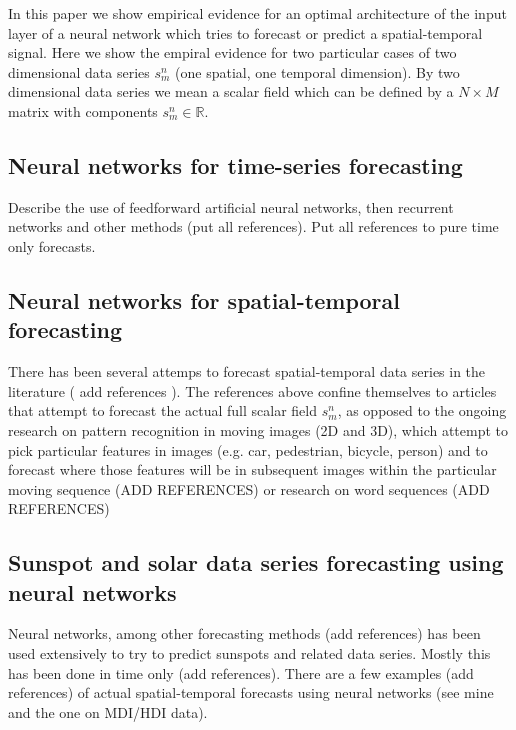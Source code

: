 \documentclass[journal]{IEEEtran}
\begin{document}
In this paper we show empirical evidence for an optimal architecture of the input layer of a neural network which tries
to forecast or predict a spatial-temporal signal. Here we show the empiral evidence for two particular cases of
two dimensional data series $s^n_m$ (one spatial,
one temporal dimension). By two dimensional data series we mean a scalar field which can be
defined by a $N\times M$ matrix with components $s^n_m \in \mathbb{R}$.

\subsection{Neural networks for time-series forecasting}

\cite{McCulloch1943}

Describe the use of feedforward artificial neural networks, then recurrent networks and other methods (put all references).
Put all references to pure time only forecasts.

\subsection{Neural networks for spatial-temporal forecasting}

There has been several attemps to forecast spatial-temporal data series in the literature ( add references \cite{2017arXiv170805094M,
2017arXiv171100636M, ghaderi2017deepforecast}).
The references above
confine themselves to articles that attempt to forecast the actual full scalar field  $s^n_m$, as opposed to the ongoing research on
pattern recognition in moving images (2D and 3D), which attempt to pick particular features in images (e.g. car, pedestrian, bicycle,
person) and to forecast where those features will be in subsequent images within the particular moving sequence (ADD REFERENCES)
 or research
on word sequences (ADD REFERENCES)

\subsection{Sunspot and solar data series forecasting using neural networks}

Neural networks, among other forecasting methods (add references) has been used extensively to try to predict sunspots and related
data series. Mostly this has been done in time only (add references). There are a few examples (add references) of actual spatial-temporal
forecasts using neural networks (see mine and the one on MDI/HDI data).
\end{document}
